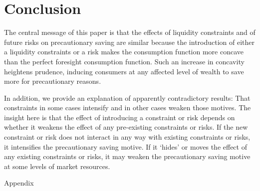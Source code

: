 \documentclass[titlepage,letterpaper]{\econtex}
\begin{document}
\section{Conclusion}

The central message of this paper is that the effects of liquidity constraints and of future risks on precautionary saving are similar because the introduction of either a liquidity constraints or a risk makes the consumption function more concave than the perfect foresight consumption function. Such an increase in concavity heightens prudence, inducing consumers at any affected level of wealth to save more for precautionary reasons. 

In addition, we provide an explanation of apparently contradictory results: That constraints in some cases intensify and in other cases weaken those motives. The insight here is that the effect of introducing a constraint or risk depends on whether it weakens the effect of any pre-existing constraints or risks. If the new constraint or risk does not interact in any way with existing constraints or risks, it intensifies the precautionary saving motive. If it `hides' or moves the effect of any existing constraints or risks, it may weaken the precautionary saving motive at some levels of market resources.

\vfill\eject
\appendix

\centerline{\LARGE Appendix}
\medskip
\end{document}
